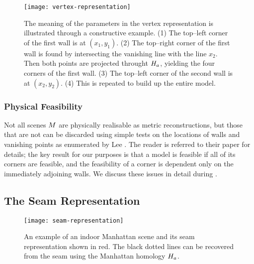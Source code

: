 \begin{figure}[tb]
  \centering
  \texttt{[image: vertex-representation]}
  \caption{The meaning of the parameters in the vertex representation
    is illustrated through a constructive example. (1) The top--left
    corner of the first wall is at $(x_1,y_1)$. (2) The top--right
    corner of the first wall is found by intersecting the vanishing
    line with the line $x_2$. Then both points are projected throught
    $\Hcf$, yielding the four corners of the first wall. (3) The
    top--left corner of the second wall is at $(x_2,y_2)$. (4) This is
    repeated to build up the entire model.}
  \label{fig:vertex-representation}
\end{figure}

\subsubsection{Physical Feasibility}

Not all scenes $\Scene$ are physically realisable
as metric reconstructions, but those that are not can be discarded
using simple tests on the locations of walls and vanishing points as
enumerated by Lee \etal \cite{Lee09}. The reader is referred to their
paper for details; the key result for our purposes is that a model is
feasible if all of its corners are feasible, and the feasibility of a
corner is dependent only on the immediately adjoining walls. We
discuss these issues in detail during .

\subsection{The Seam Representation}
\label{sec:seam-representation}

\begin{figure}[tb]%
  \centering
  \texttt{[image: seam-representation]}
  \caption{An example of an indoor Manhattan scene and its seam
    representation shown in red. The black dotted lines can be
    recovered from the seam using the Manhattan homology $\Hcf$.}
  \label{fig:seam-example}
\end{figure}


